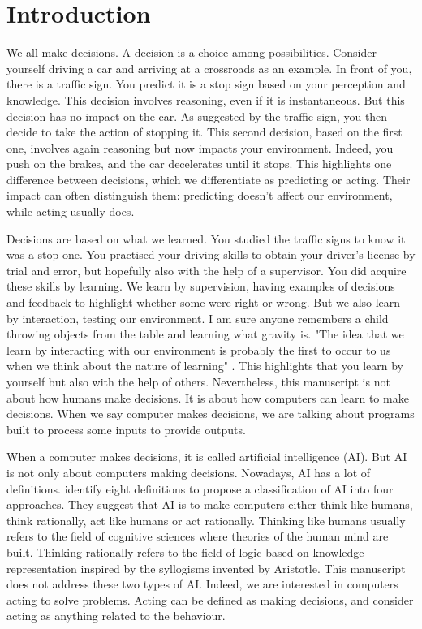 \chapter{Introduction}\label{ch:introduction}

We all make decisions.
A decision is a choice among possibilities.
Consider yourself driving a car and arriving at a crossroads as an example.
In front of you, there is a traffic sign.
You predict it is a stop sign based on your perception and knowledge.
This decision involves reasoning, even if it is instantaneous.
But this decision has no impact on the car.
As suggested by the traffic sign, you then decide to take the action of stopping it.
This second decision, based on the first one, involves again reasoning but now impacts your environment.
Indeed, you push on the brakes, and the car decelerates until it stops.
This highlights one difference between decisions, which we differentiate as predicting or acting.
Their impact can often distinguish them: predicting doesn't affect our environment, while acting usually does.

Decisions are based on what we learned.
You studied the traffic signs to know it was a stop one.
You practised your driving skills to obtain your driver's license by trial and error, but hopefully also with the help of a supervisor.
You did acquire these skills by learning.
We learn by supervision, having examples of decisions and feedback to highlight whether some were right or wrong.
But we also learn by interaction, testing our environment.
I am sure anyone remembers a child throwing objects from the table and learning what gravity is.
"The idea that we learn by interacting with our environment is probably the first to occur to us when we think about the nature of learning" \citep{sutton2018reinforcement}.
This highlights that you learn by yourself but also with the help of others.
Nevertheless, this manuscript is not about how humans make decisions. 
It is about how computers can learn to make decisions.
When we say computer makes decisions, we are talking about programs built to process some inputs to provide outputs.

When a computer makes decisions, it is called artificial intelligence (AI).
But AI is not only about computers making decisions.
Nowadays, AI has a lot of definitions.
\cite{russel2010} identify eight definitions to propose a classification of AI into four approaches.
They suggest that AI is to make computers either think like humans, think rationally, act like humans or act rationally.
Thinking like humans usually refers to the field of cognitive sciences where theories of the human mind are built.
Thinking rationally refers to the field of logic based on knowledge representation inspired by the syllogisms invented by Aristotle.
This manuscript does not address these two types of AI.
Indeed, we are interested in computers acting to solve problems.
Acting can be defined as making decisions, and \cite{russel2010} consider acting as anything related to the behaviour.


